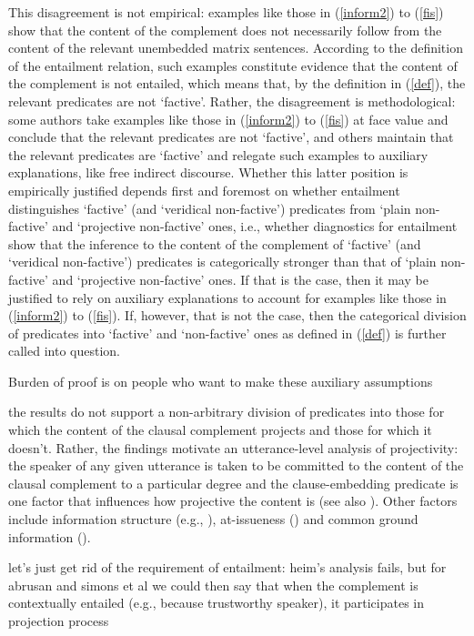 \documentclass[11pt,fleqn]{article}
\newcommand{\6}{\mbox{$[\hspace*{-.6mm}[$}}
\newcommand{\9}{\mbox{$]\hspace*{-.6mm}]$}}
\begin{document}
{This disagreement is not empirical: examples like those in (\ref{inform2}) to (\ref{fis}) show that the content of the complement does not necessarily follow from the content of the relevant unembedded matrix sentences. According to the definition of the entailment relation, such examples constitute evidence that the content of the complement is not entailed, which means that, by the definition in (\ref{def}), the relevant predicates are not `factive'. Rather, the disagreement is methodological: some authors take examples like those in (\ref{inform2}) to (\ref{fis}) at face value and conclude that the relevant predicates are not `factive', and others maintain that the relevant predicates are `factive' and relegate such examples to auxiliary explanations, like free indirect discourse. Whether this latter position is empirically justified depends first and foremost on whether entailment distinguishes `factive' (and `veridical non-factive') predicates from `plain non-factive' and `projective non-factive' ones, i.e., whether diagnostics for entailment show that the inference to the content of the complement of `factive' (and `veridical non-factive') predicates is categorically stronger than that of `plain non-factive' and `projective non-factive' ones. If that is the case, then it may be justified to rely on auxiliary explanations to account for examples like those in (\ref{inform2}) to (\ref{fis}). If, however, that is not the case, then the categorical division of predicates into `factive' and `non-factive' ones as defined in (\ref{def}) is further called into question. 

Burden of proof is on people who want to make these auxiliary assumptions

the results do not support a non-arbitrary division of predicates into those for which the content of the clausal complement projects and those for which it doesn't.  Rather, the findings motivate an utterance-level analysis of projectivity: the speaker of any given utterance is taken to be committed to the content of the clausal complement to a particular degree and the clause-embedding predicate is one factor that influences how projective the content is (see also \citealt{tbd-variability}). Other factors include information structure (e.g., \citealt{cummins-rohde2015,tonhauser-salt26,djaerv-bacovcin-salt27}), at-issueness (\citealt{tbd-variability}) and common ground information (\citealt{gazdar79a,tonhauser-etal-eval}).


let's just get rid of the requirement of entailment: heim's analysis fails, but for abrusan and simons et al we could then say that when the complement is contextually entailed (e.g., because trustworthy speaker), it participates in projection process

}
\end{document}
